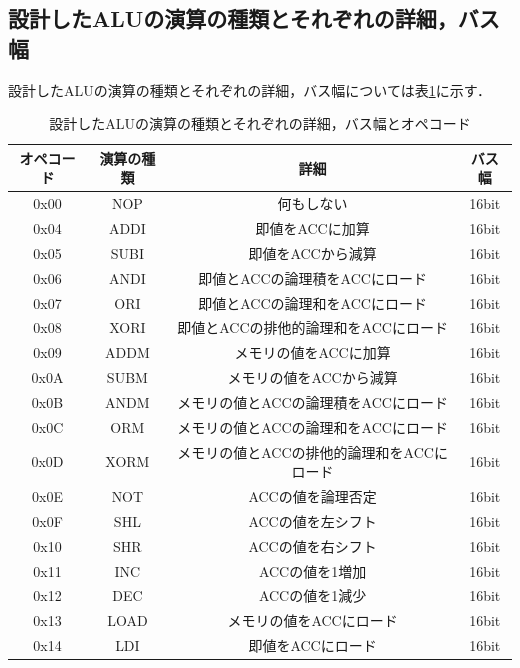 \documentclass[a4paper,11pt]{ltjsarticle}
\begin{document}
\subsection{設計したALUの演算の種類とそれぞれの詳細，バス幅}
設計したALUの演算の種類とそれぞれの詳細，バス幅については表\ref{tab:alu}に示す．
\begin{table}[H]
    \centering
    \caption{設計したALUの演算の種類とそれぞれの詳細，バス幅とオペコード}
    \label{tab:alu}
    \begin{tabular}{|c|c|c|c|}
        \hline
         オペコード&演算の種類 & 詳細 & バス幅  \\
        \hline
        0x00 & NOP & 何もしない & 16bit \\
        \hline
        0x04 & ADDI & 即値をACCに加算 & 16bit \\
        \hline
        0x05 & SUBI & 即値をACCから減算 & 16bit \\
        \hline
        0x06 & ANDI & 即値とACCの論理積をACCにロード & 16bit \\
        \hline
        0x07 & ORI & 即値とACCの論理和をACCにロード & 16bit \\
        \hline
        0x08 & XORI & 即値とACCの排他的論理和をACCにロード & 16bit \\
        \hline
        0x09 & ADDM & メモリの値をACCに加算 & 16bit \\
        \hline
        0x0A & SUBM & メモリの値をACCから減算 & 16bit \\
        \hline
        0x0B & ANDM & メモリの値とACCの論理積をACCにロード & 16bit \\
        \hline
        0x0C & ORM & メモリの値とACCの論理和をACCにロード & 16bit \\
        \hline
        0x0D & XORM & メモリの値とACCの排他的論理和をACCにロード & 16bit \\
        \hline
        0x0E & NOT & ACCの値を論理否定 & 16bit \\
        \hline
        0x0F & SHL & ACCの値を左シフト & 16bit \\
        \hline
        0x10 & SHR & ACCの値を右シフト & 16bit \\
        \hline
        0x11 & INC & ACCの値を1増加 & 16bit \\
        \hline
        0x12 & DEC & ACCの値を1減少 & 16bit \\
        \hline
        0x13 & LOAD & メモリの値をACCにロード & 16bit \\
        \hline
        0x14 & LDI & 即値をACCにロード & 16bit \\

\end{tabular}
\end{table}
\end{document}
